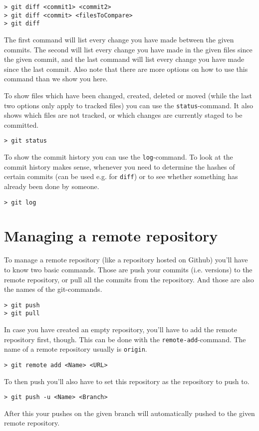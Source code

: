 \documentclass[a4paper, 12pt]{article}
\begin{document}
		\begin{lstlisting}
> git diff <commit1> <commit2>
> git diff <commit> <filesToCompare>
> git diff
		\end{lstlisting}
		
		The first command will list every change you have made between the given commits. The second will list every change you have made in the given files since the given commit, and the last command will list every change you have made since the last commit. Also note that there are more options on how to use this command than we show you here.
		\newpage
		
		To show files which have been changed, created, deleted or moved (while the last two options only apply to tracked files) you can use the \lstinline|status|-command. It also shows which files are not tracked, or which changes are currently staged to be committed.
		
		\begin{lstlisting}
> git status
		\end{lstlisting}
		
		To show the commit history you can use the \lstinline|log|-command. To look at the commit history makes sense, whenever you need to determine the hashes of certain commits (can be used e.g. for \lstinline|diff|) or to see whether something has already been done by someone.
		
		\begin{lstlisting}
> git log
		\end{lstlisting}
		
	\section{Managing a remote repository}
	
		To manage a remote repository (like a repository hosted on Github) you'll have to know two basic commands. Those are push your commits (i.e. versions) to the remote repository, or pull all the commits from the repository. And those are also the names of the git-commands.
		
		\begin{lstlisting}
> git push
> git pull
		\end{lstlisting}
		
		In case you have created an empty repository, you'll have to add the remote repository first, though. This can be done with the \lstinline|remote-add|-command. The name of a remote repository usually is \lstinline|origin|.
		
		\begin{lstlisting}
> git remote add <Name> <URL>
		\end{lstlisting}
		
		To then push you'll also have to set this repository as the repository to push to.
		
		\begin{lstlisting}
> git push -u <Name> <Branch>
		\end{lstlisting}
		
		After this your pushes on the given branch will automatically pushed to the given remote repository.
\end{document}
